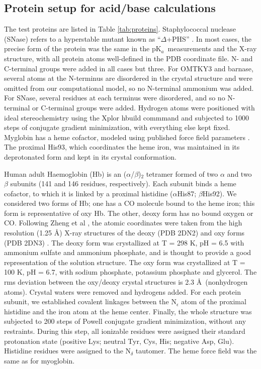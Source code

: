 \documentclass[a4paper,12pt]{article}
\newcommand{\pk}{pK$_a$}
\begin{document}
\subsection{Protein setup for acid/base calculations}
The test proteins are listed in Table \ref{tab:proteins}. Staphylococcal nuclease (SNase) refers to a hyperstable mutant
known as ``$\Delta$+PHS'' \cite{Castaneda09}. In most cases, the precise form of the protein was the same in the \pk\ 
measurements and the X-ray structure, with all protein atoms well-defined in the PDB coordinate file. N- and C-terminal
groups were added in all cases but three. For OMTKY3 and barnase, several atoms at the N-terminus are disordered in the
crystal structure and were omitted from our computational model, so no N-terminal ammonium was added. For SNase, several
residues at each terminus were disordered, and so no N-terminal or C-terminal groups were added. Hydrogen atoms were
positioned with ideal stereochemistry using the Xplor hbuild commmand and subjected to 1000 steps of conjugate gradient
minimization, with everything else kept fixed. Myglobin has a heme cofactor, modeled using published force field parameters
\cite{Giamonna84}. The proximal His93, which coordinates the heme iron, was maintained in its deprotonated form and kept
in its crystal conformation.

Human adult Haemoglobin (Hb) is an ($\alpha$/$\beta$)$_2$ tetramer formed of two $\alpha$ and two $\beta$
subunits (141 and 146 residues, respectively). Each subunit binds a heme cofactor, to which it is linked by a
proximal histidine ($\alpha$His87; $\beta$His92). We considered two forms of Hb; one has a CO molecule bound to
the heme iron; this form is representative of oxy Hb. The other, deoxy form has no bound oxygen or CO. Following
Zheng et al \cite{Zheng13}, the atomic coordinates were taken from the high resolution (1.25 \AA) X-ray structures
of the deoxy (PDB 2DN2) and oxy forms (PDB 2DN3) \cite{Park06}. The deoxy form was crystallized at T = 298 K, pH
= 6.5 with ammonium sulfate and ammonium phosphate, and is thought \cite{Zheng13} to provide a good representation
of the solution structure. The oxy form was crystallized at T = 100 K, pH = 6.7, with sodium phosphate, potassium
phosphate and glycerol. The rms deviation between the oxy/deoxy crystal structures is 2.3 \AA\ (nonhydrogen atoms).
Crystal waters were removed and hydrogens added. For each protein subunit, we established covalent linkages between
the N$_\epsilon$ atom of the proximal histidine and the iron atom at the heme center. Finally, the whole structure
was subjected to 200 steps of Powell conjugate gradient minimization, without any restraints. During this step, all
ionizable residues were assigned their standard protonation state (positive Lys; neutral Tyr, Cys, His; negative Asp,
Glu). Histidine residues were assigned to the N$_\delta$ tautomer. The heme force field was the same as for myoglobin.
\end{document}
